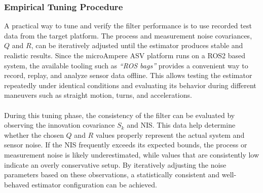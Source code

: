 \subsubsection{Empirical Tuning Procedure}
A practical way to tune and verify the filter performance is to use recorded test data from the target platform. The process and measurement noise covariances, $Q$ and $R$, can be iteratively adjusted until the estimator produces stable and realistic results. Since the microAmpere ASV platform runs on a ROS2 based system, the available tooling such as \textit{``ROS bags''} provides a convenient way to record, replay, and analyze sensor data offline. This allows testing the estimator repeatedly under identical conditions and evaluating its behavior during different maneuvers such as straight motion, turns, and accelerations.  
\\ \\
During this tuning phase, the consistency of the filter can be evaluated by observing the innovation covariance $S_k$ and NIS. This data help determine whether the chosen $Q$ and $R$ values properly represent the actual system and sensor noise. If the NIS frequently exceeds its expected bounds, the process or measurement noise is likely underestimated, while values that are consistently low indicate an overly conservative setup. By iteratively adjusting the noise parameters based on these observations, a statistically consistent and well-behaved estimator configuration can be achieved.



